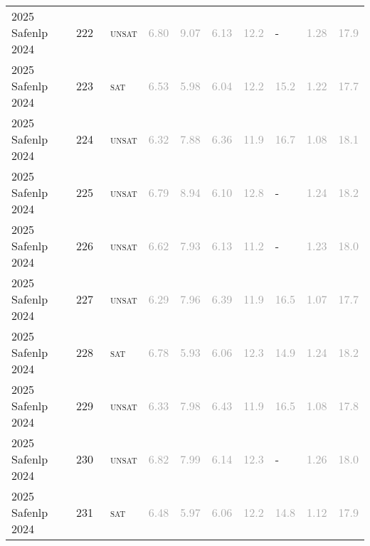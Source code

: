 \begin{center}
{\begin{longtable}{@{}llllllllll@{}}
2025 Safenlp 2024 & 222 & ~\textsc{unsat} & \textcolor{darkgray}{6.80} & \textcolor{darkgray}{9.07} & \textcolor{darkgray}{6.13} & \textcolor{darkgray}{12.2} & - & \textcolor{darkgray}{1.28} & \textcolor{darkgray}{17.9} \\
2025 Safenlp 2024 & 223 & ~\textsc{sat} & \textcolor{darkgray}{6.53} & \textcolor{darkgray}{5.98} & \textcolor{darkgray}{6.04} & \textcolor{darkgray}{12.2} & \textcolor{darkgray}{15.2} & \textcolor{darkgray}{1.22} & \textcolor{darkgray}{17.7} \\
2025 Safenlp 2024 & 224 & ~\textsc{unsat} & \textcolor{darkgray}{6.32} & \textcolor{darkgray}{7.88} & \textcolor{darkgray}{6.36} & \textcolor{darkgray}{11.9} & \textcolor{darkgray}{16.7} & \textcolor{darkgray}{1.08} & \textcolor{darkgray}{18.1} \\
2025 Safenlp 2024 & 225 & ~\textsc{unsat} & \textcolor{darkgray}{6.79} & \textcolor{darkgray}{8.94} & \textcolor{darkgray}{6.10} & \textcolor{darkgray}{12.8} & - & \textcolor{darkgray}{1.24} & \textcolor{darkgray}{18.2} \\
2025 Safenlp 2024 & 226 & ~\textsc{unsat} & \textcolor{darkgray}{6.62} & \textcolor{darkgray}{7.93} & \textcolor{darkgray}{6.13} & \textcolor{darkgray}{11.2} & - & \textcolor{darkgray}{1.23} & \textcolor{darkgray}{18.0} \\
2025 Safenlp 2024 & 227 & ~\textsc{unsat} & \textcolor{darkgray}{6.29} & \textcolor{darkgray}{7.96} & \textcolor{darkgray}{6.39} & \textcolor{darkgray}{11.9} & \textcolor{darkgray}{16.5} & \textcolor{darkgray}{1.07} & \textcolor{darkgray}{17.7} \\
2025 Safenlp 2024 & 228 & ~\textsc{sat} & \textcolor{darkgray}{6.78} & \textcolor{darkgray}{5.93} & \textcolor{darkgray}{6.06} & \textcolor{darkgray}{12.3} & \textcolor{darkgray}{14.9} & \textcolor{darkgray}{1.24} & \textcolor{darkgray}{18.2} \\
2025 Safenlp 2024 & 229 & ~\textsc{unsat} & \textcolor{darkgray}{6.33} & \textcolor{darkgray}{7.98} & \textcolor{darkgray}{6.43} & \textcolor{darkgray}{11.9} & \textcolor{darkgray}{16.5} & \textcolor{darkgray}{1.08} & \textcolor{darkgray}{17.8} \\
2025 Safenlp 2024 & 230 & ~\textsc{unsat} & \textcolor{darkgray}{6.82} & \textcolor{darkgray}{7.99} & \textcolor{darkgray}{6.14} & \textcolor{darkgray}{12.3} & - & \textcolor{darkgray}{1.26} & \textcolor{darkgray}{18.0} \\
2025 Safenlp 2024 & 231 & ~\textsc{sat} & \textcolor{darkgray}{6.48} & \textcolor{darkgray}{5.97} & \textcolor{darkgray}{6.06} & \textcolor{darkgray}{12.2} & \textcolor{darkgray}{14.8} & \textcolor{darkgray}{1.12} & \textcolor{darkgray}{17.9} \\

\end{longtable}}
\end{center}
